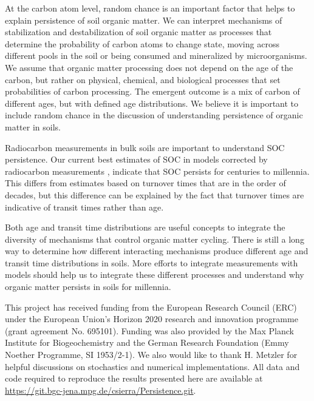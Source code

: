 \documentclass[draft,linenumbers]{agujournal}
\begin{document}
At the carbon atom level, random chance is an important factor that helps to explain persistence of soil organic matter. We can interpret mechanisms of stabilization and destabilization of soil organic matter as processes that determine the probability of carbon atoms to change state, moving across different pools in the soil or being consumed and mineralized by microorganisms. We assume that organic matter processing does not depend on the age of the carbon, but rather on physical, chemical, and biological processes that set probabilities of carbon processing. The emergent outcome is a mix of carbon of different ages, but with defined age distributions. We believe it is important to include random chance in the discussion of understanding persistence of organic matter in soils. 

Radiocarbon measurements in bulk soils are important to understand SOC persistence. Our current best estimates of SOC in models corrected by radiocarbon measurements \citep{He2016}, indicate that SOC persists for centuries to millennia. This differs from estimates based on turnover times that are in the order of decades, but this difference can be explained by the fact that turnover times are indicative of transit times rather than age. 

Both age and transit time distributions are useful concepts to integrate the diversity of mechanisms that control organic matter cycling. There is still a long way to determine how different interacting mechanisms produce different age and transit time distributions in soils. More efforts to integrate measurements with models should help us to integrate these different processes and understand why organic matter persists in soils for millennia. 


\acknowledgments
This project has received funding from the European Research Council (ERC) under the European Union's Horizon 2020 research and innovation programme (grant agreement No.   695101). Funding was also provided by the Max Planck Institute for Biogeochemistry and the German Research Foundation (Emmy Noether Programme, SI 1953/2-1). We also would like to thank H. Metzler for helpful discussions on stochastics and numerical implementations. All data and code required to reproduce the results presented here are available at \url{https://git.bgc-jena.mpg.de/csierra/Persistence.git}.

\end{document}
